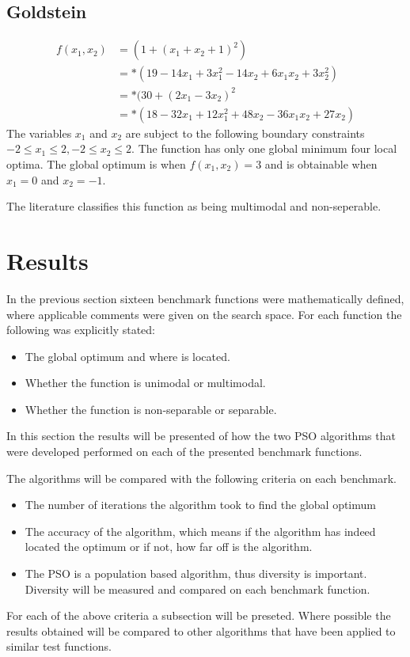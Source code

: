 \subsection{Goldstein}
\begin{align}
	f(x_1,x_2) &= (1 + (x_1 + x_2 + 1)^2)\nonumber\\
			   &=*(19-14x_1+3x_1^2 -14x_2 + 6x_1x_2 + 3x_2^2)\nonumber\\
			   &=*(30 + (2x_1 -3x_2)^2\nonumber\\
			   &=*(18 - 32x_1 + 12x_1^2 +48x_2 -36x_1x_2 + 27x_2)\nonumber
\end{align}
The variables $x_1$ and $x_2$ are subject to the following boundary constraints $-2 \leq x_1 \leq 2, -2 \leq x_2 \leq 2$\cite{ABCCompareStudy,TSGlobalOptimization,TSGlobalOptContinFunc,ContinACSTS,TestFunctions}. The function has only one global minimum four local optima\cite{ABCCompareStudy,TSGlobalOptimization}. The global optimum is when $f(x_1,x_2) = 3$ and is obtainable when $x_1 = 0$ and $x_2 = -1$\cite{ABCCompareStudy,TSGlobalOptimization,TSGlobalOptContinFunc,ContinACSTS,TestFunctions}.

The literature classifies this function as being multimodal and non-seperable\cite{ABCCompareStudy}.

\section{Results}
\label{sec:benchResults}
In the previous section sixteen benchmark functions were mathematically defined, where applicable comments were given on the search space. For each function the following was explicitly stated:
\begin{itemize}
\item The global optimum and where is located.
\item Whether the function is unimodal or multimodal.
\item Whether the function is non-separable or separable.
\end{itemize}
In this section the results will be presented of how the two PSO algorithms that were developed performed on each of the presented benchmark functions. 

The algorithms will be compared with the following criteria on each benchmark.
\begin{itemize}
\item The number of iterations the algorithm took to find the global optimum
\item The accuracy of the algorithm, which means if the algorithm has indeed located the optimum or if not, how far off is the algorithm.
\item The PSO is a population based algorithm, thus diversity is important. Diversity will be measured and compared on each benchmark function.
\end{itemize}
For each of the above criteria a subsection will be preseted. Where possible the results obtained will be compared to other algorithms that have been applied to similar test functions.

